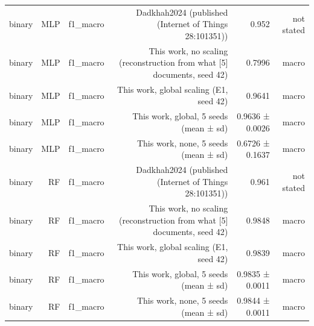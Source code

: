 \begin{table}[htbp]
{\begin{tabular}{lrrrrr}
binary & MLP & f1\_macro & Dadkhah2024 (published (Internet of Things 28:101351)) & 0.952 & not stated \\
binary & MLP & f1\_macro & This work, no scaling (reconstruction from what [5] documents, seed 42) & 0.7996 & macro \\
binary & MLP & f1\_macro & This work, global scaling (E1, seed 42) & 0.9641 & macro \\
binary & MLP & f1\_macro & This work, global, 5 seeds (mean ± sd) & 0.9636 ± 0.0026 & macro \\
binary & MLP & f1\_macro & This work, none, 5 seeds (mean ± sd) & 0.6726 ± 0.1637 & macro \\
binary & RF & f1\_macro & Dadkhah2024 (published (Internet of Things 28:101351)) & 0.961 & not stated \\
binary & RF & f1\_macro & This work, no scaling (reconstruction from what [5] documents, seed 42) & 0.9848 & macro \\
binary & RF & f1\_macro & This work, global scaling (E1, seed 42) & 0.9839 & macro \\
binary & RF & f1\_macro & This work, global, 5 seeds (mean ± sd) & 0.9835 ± 0.0011 & macro \\
binary & RF & f1\_macro & This work, none, 5 seeds (mean ± sd) & 0.9844 ± 0.0011 & macro \\
\bottomrule
\end{tabular}}
\end{table}
